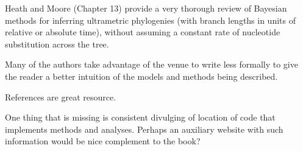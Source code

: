 \documentclass[letterpaper,12pt]{article}
\begin{document}
Heath and Moore (Chapter 13) provide a very thorough review of Bayesian methods
for inferring ultrametric phylogenies (with branch lengths in units  of
relative or absolute time), without assuming a constant rate of nucleotide
substitution across the tree.



Many of the authors take advantage of the venue to write less formally to give
the reader a better intuition of the models and methods being described.

References are great resource.

One thing that is missing is consistent divulging of location of code that implements methods and analyses.
Perhaps an auxiliary website with such information would be nice complement to the book?



\end{document}
